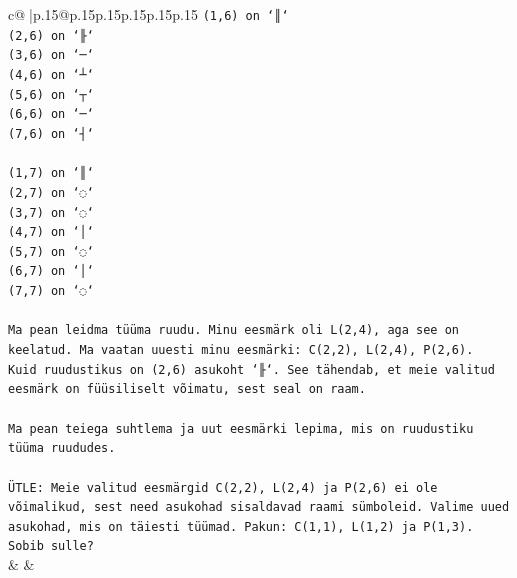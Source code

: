 \documentclass{article}
\begin{document}
{\begin{supertabular}{c@{$\;$}|p{.15\linewidth}@{}p{.15\linewidth}p{.15\linewidth}p{.15\linewidth}p{.15\linewidth}p{.15\linewidth}}
{{{\texttt{(1,6) on `║`} \\
\texttt{(2,6) on `╟`} \\
\texttt{(3,6) on `─`} \\
\texttt{(4,6) on `┴`} \\
\texttt{(5,6) on `┬`} \\
\texttt{(6,6) on `─`} \\
\texttt{(7,6) on `┤`} \\
\\ 
\texttt{(1,7) on `║`} \\
\texttt{(2,7) on `◌`} \\
\texttt{(3,7) on `◌`} \\
\texttt{(4,7) on `│`} \\
\texttt{(5,7) on `◌`} \\
\texttt{(6,7) on `│`} \\
\texttt{(7,7) on `◌`} \\
\\ 
\texttt{Ma pean leidma tüüma ruudu. Minu eesmärk oli L(2,4), aga see on keelatud. Ma vaatan uuesti minu eesmärki: C(2,2), L(2,4), P(2,6).} \\
\texttt{Kuid ruudustikus on (2,6) asukoht `╟`. See tähendab, et meie valitud eesmärk on füüsiliselt võimatu, sest seal on raam.} \\
\\ 
\texttt{Ma pean teiega suhtlema ja uut eesmärki lepima, mis on ruudustiku tüüma ruududes.} \\
\\ 
\texttt{ÜTLE: Meie valitud eesmärgid C(2,2), L(2,4) ja P(2,6) ei ole võimalikud, sest need asukohad sisaldavad raami sümboleid. Valime uued asukohad, mis on täiesti tüümad. Pakun: C(1,1), L(1,2) ja P(1,3). Sobib sulle?} \\
            }
        }
    }
    & & \\ \\


\end{supertabular}}
\end{document}
